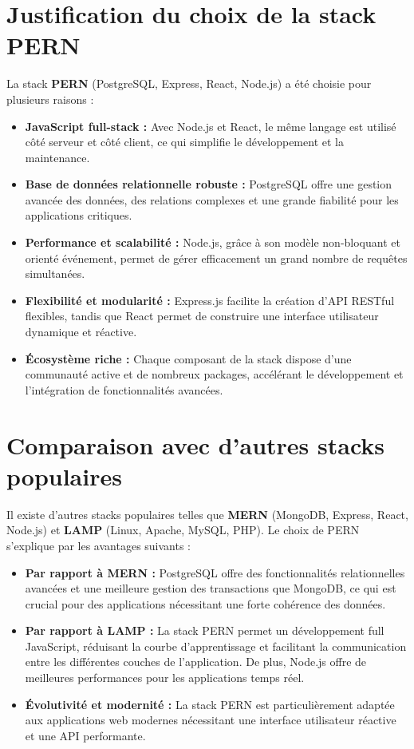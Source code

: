 \documentclass[12pt,a4paper]{report}
\begin{document}
\section*{Justification du choix de la stack PERN}

La stack \textbf{PERN} (PostgreSQL, Express, React, Node.js) a été choisie pour plusieurs raisons :  

\begin{itemize}
    \item \textbf{JavaScript full-stack :} Avec Node.js et React, le même langage est utilisé côté serveur et côté client, ce qui simplifie le développement et la maintenance.
    \item \textbf{Base de données relationnelle robuste :} PostgreSQL offre une gestion avancée des données, des relations complexes et une grande fiabilité pour les applications critiques.
    \item \textbf{Performance et scalabilité :} Node.js, grâce à son modèle non-bloquant et orienté événement, permet de gérer efficacement un grand nombre de requêtes simultanées.
    \item \textbf{Flexibilité et modularité :} Express.js facilite la création d’API RESTful flexibles, tandis que React permet de construire une interface utilisateur dynamique et réactive.
    \item \textbf{Écosystème riche :} Chaque composant de la stack dispose d’une communauté active et de nombreux packages, accélérant le développement et l’intégration de fonctionnalités avancées.
\end{itemize}

\section*{Comparaison avec d’autres stacks populaires}

Il existe d’autres stacks populaires telles que \textbf{MERN} (MongoDB, Express, React, Node.js) et \textbf{LAMP} (Linux, Apache, MySQL, PHP). Le choix de PERN s’explique par les avantages suivants :

\begin{itemize}
    \item \textbf{Par rapport à MERN :} PostgreSQL offre des fonctionnalités relationnelles avancées et une meilleure gestion des transactions que MongoDB, ce qui est crucial pour des applications nécessitant une forte cohérence des données.
    \item \textbf{Par rapport à LAMP :} La stack PERN permet un développement full JavaScript, réduisant la courbe d’apprentissage et facilitant la communication entre les différentes couches de l’application. De plus, Node.js offre de meilleures performances pour les applications temps réel.
    \item \textbf{Évolutivité et modernité :} La stack PERN est particulièrement adaptée aux applications web modernes nécessitant une interface utilisateur réactive et une API performante.
\end{itemize}
\end{document}
